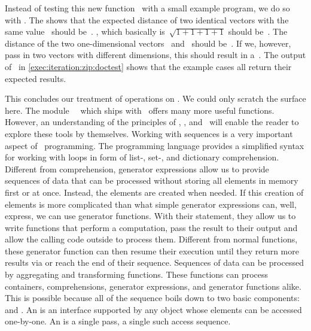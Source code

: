 Instead of testing this new function~ with a small example program, we do so with .
The  shows that the expected distance of two identical vectors with the same value~\pythonil{[1, 1]} should be~.
, which basically is~$\sqrt{1 + 1 + 1 + 1}$ should be~.
The distance of the two one-dimensional vectors~\pythonil{[100]} and~\pythonil{[10]} should be~.
If we, however, pass in two vectors with different dimensions, this should result in a~.
The output of \pytest\ in \cref{exec:iteration:zip:doctest} shows that the example cases all return their expected results.

This concludes our treatment of operations on .
We could only scratch the surface here.
The module~~\cite{PSF:P3D:TPSL:IFCIFEL} which ships with \python\ offers many more useful functions.
However, an understanding of the principles of , , and~ will enable the reader to explore these tools by themselves.%
\FloatBarrier%
\endhsection%
%
%
%
Working with sequences is a very important aspect of \python\ programming.
The programming language provides a simplified syntax for working with loops in form of list-, set-, and dictionary comprehension.
Different from comprehension, generator expressions allow us to provide sequences of data that can be processed without storing all elements in memory first or at once.
Instead, the elements are created when needed.
If this creation of elements is more complicated than what simple generator expressions can, well, express, we can use generator functions.
With their  statement, they allow us to write functions that perform a computation, pass the result to their output and allow the calling code outside to process them.
Different from normal functions, these generator function can then resume their execution until they return more results via  or reach the end of their sequence.
Sequences of data can be processed by aggregating and transforming functions.
These functions can process containers, comprehensions, generator expressions, and generator functions alike.
This is possible because all of the sequence  boils down to two basic components:  and .
An  is an interface supported by any object whose elements can be accessed one-by-one.
An  is a single pass, a single such access sequence.%
\endhsection%
%
\endhsection%
%
